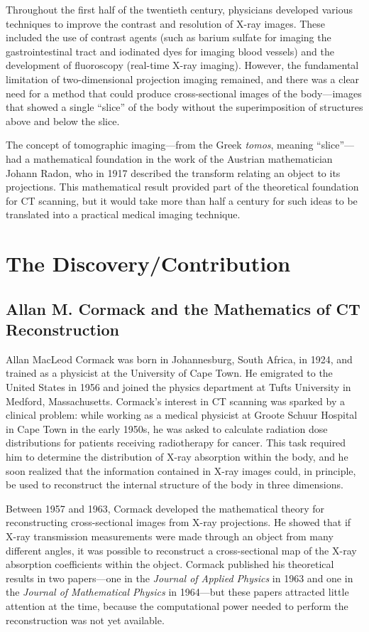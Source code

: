 Throughout the first half of the twentieth century, physicians developed various techniques to improve the contrast and resolution of X-ray images. These included the use of contrast agents (such as barium sulfate for imaging the gastrointestinal tract and iodinated dyes for imaging blood vessels) and the development of fluoroscopy (real-time X-ray imaging). However, the fundamental limitation of two-dimensional projection imaging remained, and there was a clear need for a method that could produce cross-sectional images of the body---images that showed a single ``slice'' of the body without the superimposition of structures above and below the slice.

The concept of tomographic imaging---from the Greek \emph{tomos}, meaning ``slice''---had a mathematical foundation in the work of the Austrian mathematician Johann Radon, who in 1917 described the transform relating an object to its projections. This mathematical result provided part of the theoretical foundation for CT scanning, but it would take more than half a century for such ideas to be translated into a practical medical imaging technique.

\section{The Discovery/Contribution}

\subsection{Allan M. Cormack and the Mathematics of CT Reconstruction}

Allan MacLeod Cormack was born in Johannesburg, South Africa, in 1924, and trained as a physicist at the University of Cape Town. He emigrated to the United States in 1956 and joined the physics department at Tufts University in Medford, Massachusetts. Cormack's interest in CT scanning was sparked by a clinical problem: while working as a medical physicist at Groote Schuur Hospital in Cape Town in the early 1950s, he was asked to calculate radiation dose distributions for patients receiving radiotherapy for cancer. This task required him to determine the distribution of X-ray absorption within the body, and he soon realized that the information contained in X-ray images could, in principle, be used to reconstruct the internal structure of the body in three dimensions.

Between 1957 and 1963, Cormack developed the mathematical theory for reconstructing cross-sectional images from X-ray projections. He showed that if X-ray transmission measurements were made through an object from many different angles, it was possible to reconstruct a cross-sectional map of the X-ray absorption coefficients within the object. Cormack published his theoretical results in two papers---one in the \emph{Journal of Applied Physics} in 1963 and one in the \emph{Journal of Mathematical Physics} in 1964---but these papers attracted little attention at the time, because the computational power needed to perform the reconstruction was not yet available.


